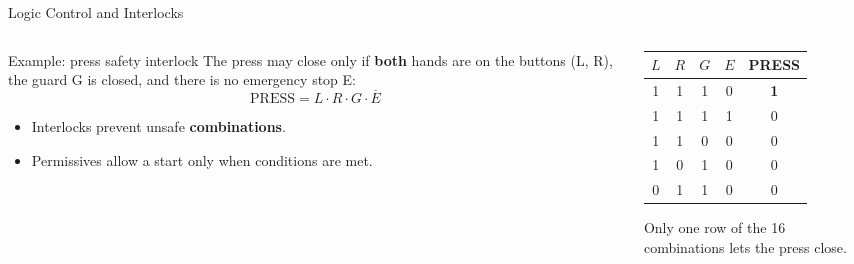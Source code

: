 \documentclass[aspectratio=169]{beamer}
\begin{document}
	\begin{frame}{Logic Control and Interlocks}
		\begin{columns}[T]
			\begin{column}{0.5\textwidth}
				\begin{block}{Example: press safety interlock}
					\small The press may close only if \textbf{both} hands are on the buttons (L, R), the guard G is closed, and there is no emergency stop E:
					\[
					\text{PRESS} = L \cdot R \cdot G \cdot \overline{E}
					\]
				\end{block}
				\begin{itemize}\small
					\item Interlocks prevent unsafe \textbf{combinations}.
					\item Permissives allow a start only when conditions are met.
				\end{itemize}
			\end{column}
			\begin{column}{0.5\textwidth}
				\renewcommand{\arraystretch}{1.1}
				\centering
				\small
				\begin{tabular}{@{}ccccc@{}}
					\toprule
					$L$ & $R$ & $G$ & $E$ & \textbf{PRESS} \\
					\midrule
					1 & 1 & 1 & 0 & \textbf{1} \\
					1 & 1 & 1 & 1 & 0 \\
					1 & 1 & 0 & 0 & 0 \\
					1 & 0 & 1 & 0 & 0 \\
					0 & 1 & 1 & 0 & 0 \\
					\bottomrule
				\end{tabular}
				\vspace{0.2cm}

				\footnotesize Only one row of the 16 combinations lets the press close.
			\end{column}
		\end{columns}
	\end{frame}
\end{document}
